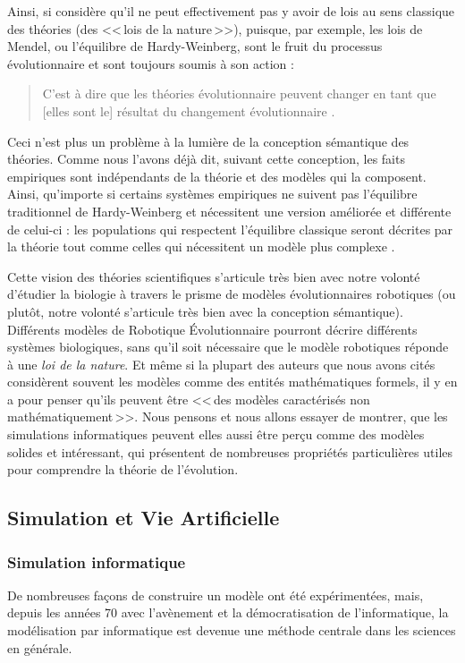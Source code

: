 Ainsi, si \cite{beatty1980whatswrongwithreceivedwiew} considère qu'il ne peut effectivement pas y avoir de lois au sens classique des théories (des <<\,lois de la nature\,>>), puisque, par exemple, les lois de Mendel, ou l'équilibre de Hardy-Weinberg, sont le fruit du processus évolutionnaire et sont toujours soumis à son action :
\begin{quote}
	C'est à dire que les théories évolutionnaire peuvent changer en tant que [elles sont le] résultat du changement évolutionnaire \citep[p.~407]{beatty1980whatswrongwithreceivedwiew}.
\end{quote}
Ceci n'est plus un problème à la lumière de la conception sémantique des théories. Comme nous l'avons déjà dit, suivant cette conception, les faits empiriques sont indépendants de la théorie et des modèles qui la composent. Ainsi, qu'importe si certains systèmes empiriques ne suivent pas l'équilibre traditionnel de Hardy-Weinberg et nécessitent une version améliorée et différente de celui-ci : les populations qui respectent l'équilibre classique seront décrites par la théorie tout comme celles qui nécessitent un modèle plus complexe \citep[p.~410-411]{beatty1980whatswrongwithreceivedwiew}.

Cette vision des théories scientifiques s'articule très bien avec notre volonté d'étudier la biologie à travers le prisme de modèles évolutionnaires robotiques (ou plutôt, notre volonté s'articule très bien avec la conception sémantique). Différents modèles de Robotique Évolutionnaire pourront décrire différents systèmes biologiques, sans qu'il soit nécessaire que le modèle robotiques réponde à une \emph{loi de la nature}. Et même si la plupart des auteurs que nous avons cités considèrent souvent les modèles comme des entités mathématiques formels, il y en a pour penser qu'ils peuvent être <<\,des modèles caractérisés non mathématiquement\,>>\citep[p. 1]{lloyd1988thesemanticapproachanditsapplicationtoevolutionarytheory}. Nous pensons et nous allons essayer de montrer, que les simulations informatiques peuvent elles aussi être perçu comme des modèles solides et intéressant, qui présentent de nombreuses propriétés particulières utiles pour comprendre la théorie de l'évolution.

\subsection{Simulation et Vie Artificielle}
\subsubsection{Simulation informatique}
De nombreuses façons de construire un modèle ont été expérimentées, mais, depuis les années 70 avec l'avènement et la démocratisation de l'informatique, la modélisation par informatique est devenue une méthode centrale dans les sciences en générale. 


